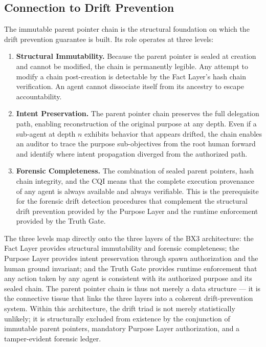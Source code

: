 \subsection{Connection to Drift Prevention}
\label{sec:drift_prevention_connection}

The immutable parent pointer chain is the structural foundation on which the drift prevention guarantee is built. Its role operates at three levels:

\begin{enumerate}
    \item \textbf{Structural Immutability.} Because the parent pointer is sealed at creation and cannot be modified, the chain is permanently legible. Any attempt to modify a chain post-creation is detectable by the Fact Layer's hash chain verification. An agent cannot dissociate itself from its ancestry to escape accountability.

    \item \textbf{Intent Preservation.} The parent pointer chain preserves the full delegation path, enabling reconstruction of the original purpose at any depth. Even if a sub-agent at depth $n$ exhibits behavior that appears drifted, the chain enables an auditor to trace the purpose sub-objectives from the root human forward and identify where intent propagation diverged from the authorized path.

    \item \textbf{Forensic Completeness.} The combination of sealed parent pointers, hash chain integrity, and the CQI means that the complete execution provenance of any agent is always available and always verifiable. This is the prerequisite for the forensic drift detection procedures that complement the structural drift prevention provided by the Purpose Layer and the runtime enforcement provided by the Truth Gate.
\end{enumerate}

The three levels map directly onto the three layers of the BX3 architecture: the Fact Layer provides structural immutability and forensic completeness; the Purpose Layer provides intent preservation through spawn authorization and the human ground invariant; and the Truth Gate provides runtime enforcement that any action taken by any agent is consistent with its authorized purpose and its sealed chain. The parent pointer chain is thus not merely a data structure — it is the connective tissue that links the three layers into a coherent drift-prevention system. Within this architecture, the drift triad is not merely statistically unlikely; it is structurally excluded from existence by the conjunction of immutable parent pointers, mandatory Purpose Layer authorization, and a tamper-evident forensic ledger.

